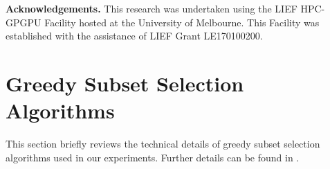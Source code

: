 \documentclass[runningheads]{llncs}
\begin{document}
\noindent \textbf{Acknowledgements.} This research was undertaken using the LIEF HPC-GPG\-PU Facility hosted at the University of Melbourne. This Facility was established with the assistance of LIEF Grant LE170100200.
%
%

\begin{small}


\end{small}

\newpage
\appendix
\section{Greedy Subset Selection Algorithms}\label{ap:sec:greedy_selection}

This section briefly reviews the technical details of greedy subset selection algorithms used in our experiments.
Further details can be found in \cite{mirzasoleiman2020craig,killamsetty2021gradmatch}.
\end{document}
